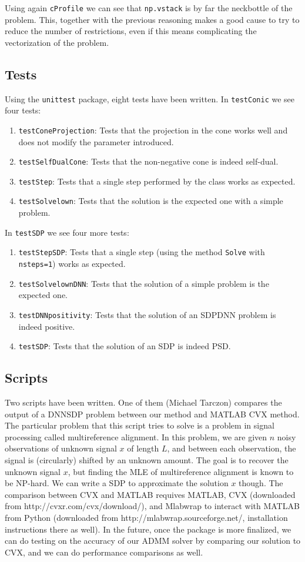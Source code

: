 \documentclass[paper=a4, fontsize=11pt]{scrartcl}
\numberwithin{equation}{section}		%
\numberwithin{figure}{section}			%
\numberwithin{table}{section}				%
\begin{document}
Using again \texttt{cProfile} we can see that \texttt{np.vstack} is by far the neckbottle of the problem. This, together with the previous reasoning makes a good cause to try to reduce the number of restrictions, even if this means complicating the vectorization of the problem.

\subsection{Tests}

Using the \texttt{unittest} package, eight tests have been written.
In \texttt{testConic} we see four tests:
\begin{enumerate}
\item \texttt{testConeProjection}: Tests that the projection in the cone works well and does not modify the parameter introduced.
\item \texttt{testSelfDualCone}: Tests that the non-negative cone is indeed self-dual.
\item \texttt{testStep}: Tests that a single step performed by the class works as expected.
\item \texttt{testSolvelown}: Tests that the solution is the expected one with a simple problem.
\end{enumerate}
In \texttt{testSDP} we see four more tests:
\begin{enumerate}
\item \texttt{testStepSDP}: Tests that a single step (using the method \texttt{Solve} with \texttt{nsteps=1}) works as expected.
\item \texttt{testSolvelownDNN}: Tests that the solution of a simple problem is the expected one.
\item \texttt{testDNNpositivity}: Tests that the solution of an SDPDNN problem is indeed positive.
\item \texttt{testSDP}: Tests that the solution of an SDP is indeed PSD.
\end{enumerate}

\subsection{Scripts}
Two scripts have been written. One of them (Michael Tarczon) compares the output of a DNNSDP problem between our method and MATLAB CVX method.  The particular problem that this script tries to solve is a problem in signal processing called multireference alignment.  In this problem, we are given $n$ noisy observations of unknown signal $x$ of length $L$, and between each observation, the signal is (circularly) shifted by an unknown amount. The goal is to recover the unknown signal $x$, but finding the MLE of multireference alignment is known to be NP-hard.  We can write a SDP to approximate the solution $x$ though.  The comparison between CVX and MATLAB requives MATLAB, CVX (downloaded from http://cvxr.com/cvx/download/), and Mlabwrap to interact with MATLAB from Python (downloaded from http://mlabwrap.sourceforge.net/, installation instructions there as well). In the future, once the package is more finalized, we can do testing on the accuracy of our ADMM solver by comparing our solution to CVX, and we can do performance comparisons as well.
\end{document}
